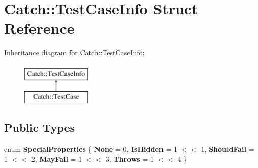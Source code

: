 \hypertarget{structCatch_1_1TestCaseInfo}{}\section{Catch\+:\+:Test\+Case\+Info Struct Reference}
\label{structCatch_1_1TestCaseInfo}
Inheritance diagram for Catch\+:\+:Test\+Case\+Info\+:\begin{figure}[H]
\begin{center}
\leavevmode
\includegraphics[height=2.000000cm]{structCatch_1_1TestCaseInfo}
\end{center}
\end{figure}
\subsection*{Public Types}
\begin{DoxyCompactItemize}
\item 
\mbox{\label{structCatch_1_1TestCaseInfo_a39b232f74b4a7a6f2183b96759027eac}} 
enum {\bfseries Special\+Properties} \{ \newline
{\bfseries None} = 0, 
{\bfseries Is\+Hidden} = 1 $<$$<$ 1, 
{\bfseries Should\+Fail} = 1 $<$$<$ 2, 
{\bfseries May\+Fail} = 1 $<$$<$ 3, 
\newline
{\bfseries Throws} = 1 $<$$<$ 4
 \}
\end{DoxyCompactItemize}
